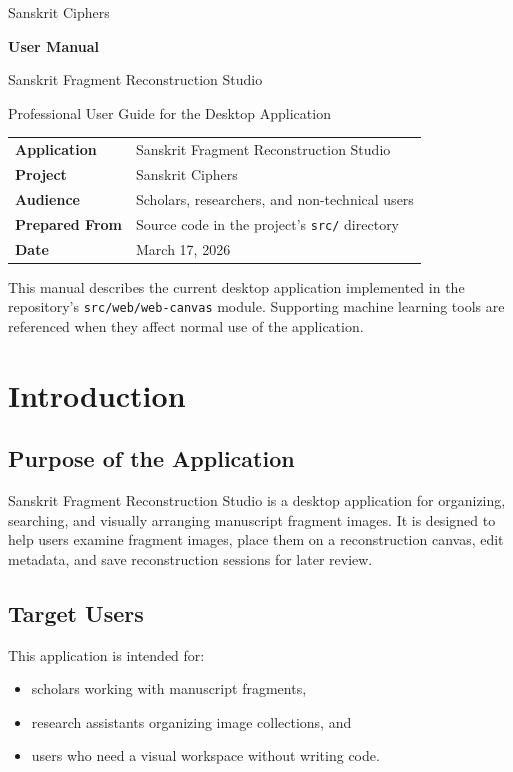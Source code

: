 \documentclass[12pt]{article}
\begin{document}

\begin{titlepage}
\centering
{\Large Sanskrit Ciphers\par}
\vspace{1.5cm}
{\Huge\bfseries User Manual\par}
\vspace{0.6cm}
{\LARGE Sanskrit Fragment Reconstruction Studio\par}
\vspace{1.5cm}
{\large Professional User Guide for the Desktop Application\par}
\vfill

\begin{tabular}{>{\bfseries}p{4cm}p{9cm}}
Application & Sanskrit Fragment Reconstruction Studio \\
Project & Sanskrit Ciphers \\
Audience & Scholars, researchers, and non-technical users \\
Prepared From & Source code in the project's \texttt{src/} directory \\
Date & March 17, 2026 \\
\end{tabular}

\vfill
This manual describes the current desktop application implemented in the repository's
\texttt{src/web/web-canvas} module. Supporting machine learning tools are referenced
when they affect normal use of the application.
\end{titlepage}

\clearpage
{}
\tableofcontents
\newpage
{}

\section{Introduction}

\subsection{Purpose of the Application}
Sanskrit Fragment Reconstruction Studio is a desktop application for organizing,
searching, and visually arranging manuscript fragment images. It is designed to help
users examine fragment images, place them on a reconstruction canvas, edit metadata,
and save reconstruction sessions for later review.

\subsection{Target Users}
This application is intended for:
\begin{itemize}
  \item scholars working with manuscript fragments,
  \item research assistants organizing image collections, and
  \item users who need a visual workspace without writing code.
\end{itemize}
\end{document}
